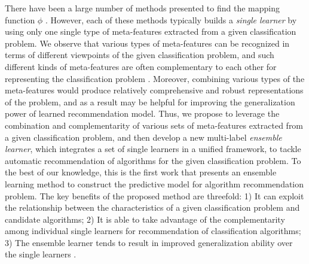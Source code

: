 \documentclass[acmsmall]{acmart}
\begin{document}
There have been a large number of methods presented to find the mapping function $\phi$
\cite{peng2002improved,Pfahringer00meta,kalousis2002algorithm,brazdil2003ranking,ali2006learning,prudencio2011selecting,song2012automatic,wang2014generic}.
However, each of these methods typically builds a \textit{single learner} by using only one single type of meta-features extracted from a given classification problem.
We observe that various types of meta-features can be recognized in terms of different viewpoints of the given classification problem,
and such different kinds of meta-features are often complementary to each other for representing the classification problem \cite{brazdil2003ranking,Bensusan1998god,peng2002improved,Pfahringer00meta,Bensusan2000casa,ho2002complexity,song2012automatic}.
Moreover,
combining various types of the meta-features
would produce relatively comprehensive and robust representations of the problem,
and as a result may be helpful for improving the generalization power of learned recommendation model.
Thus,
we propose to leverage the combination and complementarity of various sets of meta-features extracted from a given classification problem,
and then develop a new multi-label \textit{ensemble learner}, which integrates a set of single learners in a unified framework,
to tackle automatic recommendation of algorithms for the given classification problem.
To the best of our knowledge,
this is the first work that presents an ensemble learning method to construct the predictive model for algorithm recommendation problem.
The key benefits of the proposed method are threefold:
1) It can exploit the relationship between the characteristics of a given classification problem and candidate algorithms;
2) It is able to take advantage of the complementarity among individual single learners for recommendation of classification algorithms;
3) The ensemble learner tends to result in improved generalization ability over the single learners
\cite{dietterich1997machine,dietterichl2002ensemble}.


\end{document}
